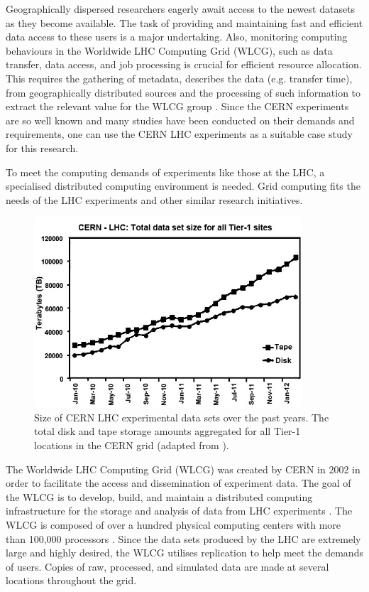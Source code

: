 Geographically dispersed researchers eagerly await access to the newest datasets as they become available. The task of providing and maintaining fast and efficient data access to these users is a major undertaking. Also, monitoring computing behaviours in the Worldwide LHC Computing Grid (WLCG), such as data transfer, data access, and job processing is crucial for efficient resource allocation. This requires the gathering of metadata, describes the data (e.g. transfer time), from geographically distributed sources and the processing of such information to extract the relevant value for the WLCG group \cite{Magnoni20}. Since the CERN experiments are so well known and many studies have been conducted on their demands and requirements, one can use the CERN LHC experiments as a suitable case study for this research.

To meet the computing demands of experiments like those at the LHC, a specialised distributed computing environment is needed. Grid computing fits the needs of the LHC experiments and other similar research initiatives.

\begin{figure}[H]
  \centering
  \includegraphics[width=100mm]{./Figures/lhc_data_size.jpg}
  \caption{\small Size of CERN LHC experimental data sets over the past years. The total disk and tape storage amounts aggregated for all Tier-1 locations in the CERN grid (adapted from \cite{LHC5}).}\label{fig:lhc_data}
\end{figure}

The Worldwide LHC Computing Grid (WLCG) was created by CERN in 2002 in order to facilitate the access and dissemination of experiment data. The goal of the WLCG is to develop, build, and maintain a distributed computing infrastructure for the storage and analysis of data from LHC experiments \cite{Knobloch6}. The WLCG is composed of over a hundred physical computing centers with more than 100,000 processors \cite{LHCGrid7}. Since the data sets produced by the LHC are extremely large and highly desired, the WLCG utilises replication to help meet the demands of users. Copies of raw, processed, and simulated data are made at several locations throughout the grid.

